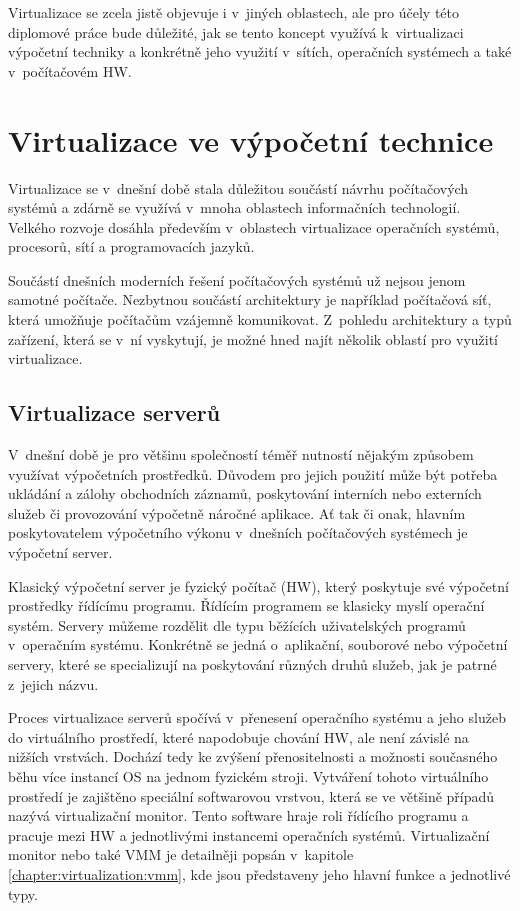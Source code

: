 Virtualizace se zcela jistě objevuje i v~jiných oblastech, ale pro účely této diplomové práce bude důležité, jak se tento koncept
využívá k~virtualizaci výpočetní techniky a konkrétně jeho využití v~sítích, operačních systémech a také v~počítačovém HW. 
\section{Virtualizace ve výpočetní technice}
\label{chapter:virtualization:it}
Virtualizace se v~dnešní době stala důležitou součástí návrhu počítačových systémů a zdárně se využívá v~mnoha oblastech informačních
technologií. Velkého rozvoje dosáhla především v~oblastech virtualizace operačních systémů, procesorů, sítí a programovacích
jazyků.

Součástí dnešních moderních řešení počítačových systémů už nejsou jenom samotné počítače. Nezbytnou součástí architektury je
například počítačová síť, která umožňuje počítačům vzájemně komunikovat. Z~pohledu architektury a typů zařízení, která se v~ní
vyskytují, je možné hned najít několik oblastí pro využití virtualizace.
\subsection{Virtualizace serverů}
\label{chapter:virtualization:it:servers}
V~dnešní době je pro většinu společností téměř nutností nějakým způsobem využívat výpočetních prostředků. Důvodem pro jejich
použití může být potřeba ukládání a zálohy obchodních záznamů, poskytování interních nebo externích služeb či provozování
výpočetně náročné aplikace. Ať tak či onak, hlavním poskytovatelem výpočetního výkonu v~dnešních počítačových systémech je
výpočetní server.

Klasický výpočetní server je fyzický počítač (HW), který poskytuje své výpočetní prostředky řídícímu programu. Řídícím programem
se klasicky myslí operační systém. Servery můžeme rozdělit dle typu běžících uživatelských programů v~operačním systému.
Konkrétně se jedná o~aplikační, souborové nebo výpočetní servery, které se specializují na poskytování různých druhů služeb,
jak je patrné z~jejich názvu.

Proces virtualizace serverů spočívá v~přenesení operačního systému a jeho služeb do virtuálního prostředí, které napodobuje
chování HW, ale není závislé na nižších vrstvách. Dochází tedy ke zvýšení přenositelnosti a možnosti současného běhu více 
instancí OS na jednom fyzickém stroji. Vytváření tohoto virtuálního prostředí je zajištěno speciální softwarovou vrstvou, která
se ve většině případů nazývá virtualizační monitor. Tento software hraje roli řídícího programu a pracuje mezi HW a jednotlivými
instancemi operačních systémů. Virtualizační monitor nebo také VMM je detailněji popsán v~kapitole \ref{chapter:virtualization:vmm},
kde jsou představeny jeho hlavní funkce a jednotlivé typy.

